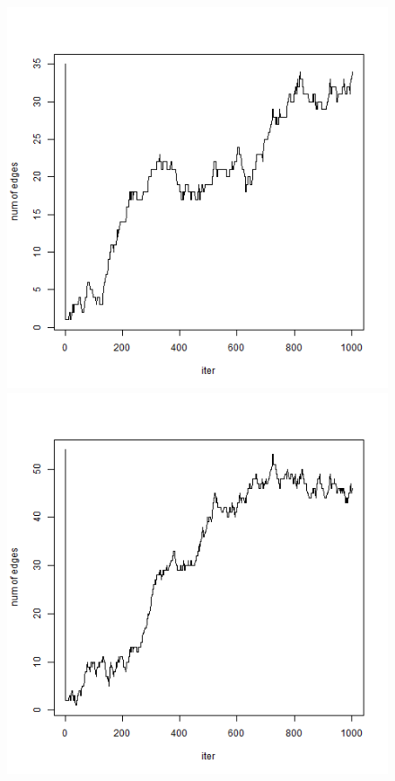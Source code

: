 \documentclass[aspectratio=169,ignorenonframetext,9pt]{beamer}
\theoremstyle{plain}
\theoremstyle{definition}
\begin{document}
\begin{figure}[h]
    \begin{center}
        \includegraphics[scale=0.23]{pictures/net1seq_chain1_lastsampler_num_edges.png}
        \includegraphics[scale=0.23]{pictures/net2seq_chain1_lastsampler_num_edges.png}

\end{center}
\end{figure}
\end{document}
